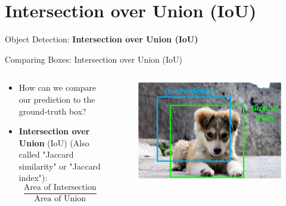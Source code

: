 \section{Intersection over Union (IoU)}
\begin{frame}{}
    \LARGE Object Detection: \textbf{Intersection over Union (IoU)}
\end{frame}

\begin{frame}{Comparing Boxes: Intersection over Union (IoU)}
    \begin{columns}
        \begin{column}{0.5\textwidth}
            \begin{itemize}
                \item How can we compare our prediction to the ground-truth box?
                \item<2-> \textbf{Intersection over Union} (IoU) (Also called "Jaccard similarity" or "Jaccard index"):
                $$\frac{\text{Area of Intersection}}{\text{Area of Union}}$$
            \end{itemize}
        \end{column}

        \begin{column}{0.5\textwidth}
            \begin{figure}
            \centering
            \includegraphics[width=1.0\textwidth,height=1.0\textheight,keepaspectratio]{images/object-detect/object_2.png}
            \end{figure}
        \end{column}
    \end{columns}
\end{frame}

